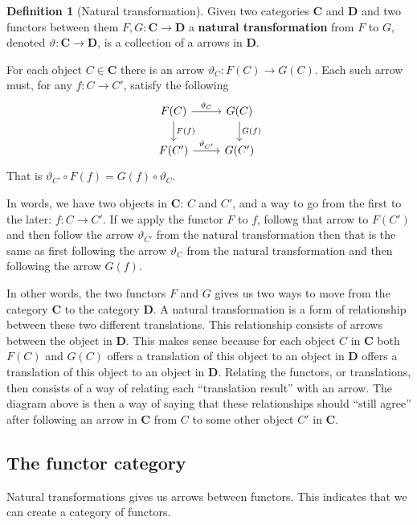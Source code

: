 \documentclass{book}
\theoremstyle{definition}
\newtheorem{definition}{Definition}[section]
\begin{document}
\begin{definition}[Natural transformation]
  Given two categories \textbf{C} and \textbf{D} and two functors between them
  $F, G : \mathbf{C} \to \mathbf{D}$ a \textbf{natural transformation} from $F$ to
  $G$, denoted $\vartheta : \mathbf{C} \to \mathbf{D}$, is a collection of a arrows
  in \textbf{D}.

  For each object $C \in \mathbf{C}$ there is an arrow
  $\vartheta_{C} : F(C) \to G(C)$. Each such arrow must, for any $f : C \to C'$,
  satisfy the following
  \[
    \begin{tikzcd}
      F(C) \ar[d, "F(f)"]\ar[r, "\vartheta_{C}"] & G(C) \ar[d, "G(f)"] \\
      F(C') \ar[r, "\vartheta_{C'}"] & G(C')
    \end{tikzcd}
  \]
  That is $\vartheta_{C'} \circ F(f) = G(f) \circ \vartheta_{C}$.

  In words, we have two objects in \textbf{C}: $C$ and $C'$, and a way to go
  from the first to the later: $f : C \to C'$. If we apply the functor $F$ to
  $f$, followg that arrow to $F(C')$ and then follow the arrow $\vartheta_{C'}$
  from the natural transformation then that is the same as first following the
  arrow $\vartheta_{C}$ from the natural transformation and then following the
  arrow $G(f)$.

  In other words, the two functors $F$ and $G$ gives us two ways to move from
  the category \textbf{C} to the category \textbf{D}. A natural transformation
  is a form of relationship between these two different translations. This
  relationship consists of arrows between the object in \textbf{D}. This makes
  sense because for each object $C$ in $\mathbf{C}$ both $F(C)$ and $G(C)$
  offers a translation of this object to an object in $\mathbf{D}$ offers a
  translation of this object to an object in $\mathbf{D}$. Relating the
  functors, or translations, then consists of a way of relating each
  ``translation result'' with an arrow. The diagram above is then a way of
  saying that these relationships should ``still agree'' after following an
  arrow in \textbf{C} from $C$ to some other object $C'$ in \textbf{C}.
\end{definition}

\subsection{The functor category}

Natural transformations gives us arrows between functors. This indicates that we
can create a category of functors.
\end{document}
